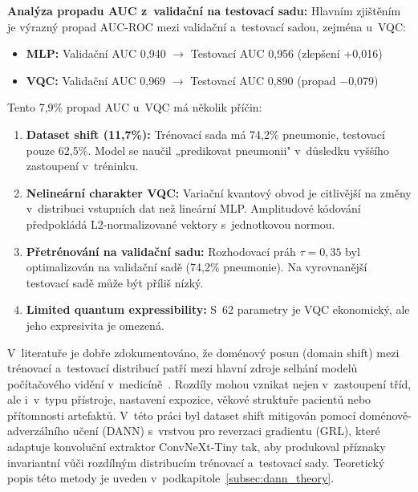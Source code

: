 \documentclass[12pt, a4paper]{report}
\begin{document}
\textbf{Analýza propadu AUC z~validační na testovací sadu:}
Hlavním zjištěním je výrazný propad AUC-ROC mezi validační a~testovací sadou, zejména u~VQC:

\begin{itemize}
    \item \textbf{MLP:} Validační AUC 0{,}940 $\rightarrow$ Testovací AUC 0{,}956 (zlepšení +0{,}016)
    \item \textbf{VQC:} Validační AUC 0{,}969 $\rightarrow$ Testovací AUC 0{,}890 (propad $-$0{,}079)
\end{itemize}

Tento 7{,}9\% propad AUC u~VQC má několik příčin:

\begin{enumerate}
    \item \textbf{Dataset shift (11{,}7\%):} Trénovací sada má 74{,}2\% pneumonie, testovací pouze 62{,}5\%. Model se naučil „predikovat pneumonii" v~důsledku vyššího zastoupení v~tréninku.
    
    \item \textbf{Nelineární charakter VQC:} Variační kvantový obvod je citlivější na změny v~distribuci vstupních dat než lineární MLP. Amplitudové kódování předpokládá L2-normalizované vektory s~jednotkovou normou.
    
    \item \textbf{Přetrénování na validační sadu:} Rozhodovací práh $\tau = 0{,}35$ byl optimalizován na validační sadě (74{,}2\% pneumonie). Na vyrovnanější testovací sadě může být příliš nízký.
    
    \item \textbf{Limited quantum expressibility:} S~62 parametry je VQC ekonomický, ale jeho expresivita je omezená.
\end{enumerate}

V~literatuře je dobře zdokumentováno, že doménový posun (domain shift) mezi trénovací a~testovací distribucí patří mezi hlavní zdroje selhání modelů počítačového vidění v~medicíně~\cite{domain_shift_chestxray}. Rozdíly mohou vznikat nejen v~zastoupení tříd, ale i~v~typu přístroje, nastavení expozice, věkové struktuře pacientů nebo přítomnosti artefaktů. V~této práci byl dataset shift mitigován pomocí doménově-adverzálního učení (DANN) s~vrstvou pro reverzaci gradientu (GRL), které adaptuje konvoluční extraktor ConvNeXt-Tiny tak, aby produkoval příznaky invariantní vůči rozdílným distribucím trénovací a~testovací sady. Teoretický popis této metody je uveden v~podkapitole~\ref{subsec:dann_theory}.
\end{document}
